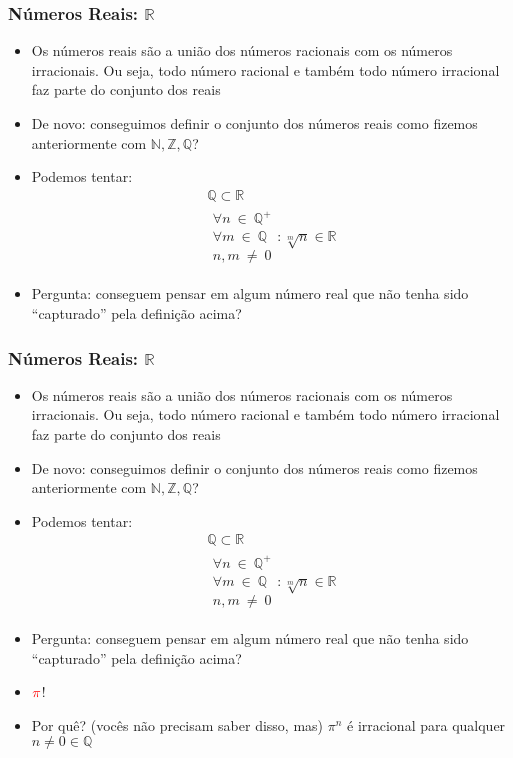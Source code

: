 \documentclass[usenames,dvipsnames,svgnames]{beamer}
\begin{document}
\begin{frame}
	
	\frametitle{Números Reais: $\mathbb{R}$}

	\begin{itemize}
		\item Os números reais são a união dos números racionais com os números irracionais. Ou seja, todo número racional e também todo número irracional faz parte do conjunto dos reais
		\item De novo: conseguimos definir o conjunto dos números reais como fizemos anteriormente com $\mathbb{N}, \mathbb{Z}, \mathbb{Q}$?
		\item Podemos tentar:
			\begin{equation}
			\begin{aligned}
				\mathbb{Q} \subset \mathbb{R} \\
				\substack{\forall n ~\in~ \mathbb{Q}^{+} \\ \forall m ~\in~ \mathbb{Q} \\ n,m ~\neq~ 0}: \sqrt[m]{n} \in \mathbb{R}
			\end{aligned}
			\end{equation}
		\item Pergunta: conseguem pensar em algum número real que não tenha sido ``capturado'' pela definição acima?
	\end{itemize}

\end{frame}

\begin{frame}
	
	\frametitle{Números Reais: $\mathbb{R}$}

	\begin{itemize}
		\item Os números reais são a união dos números racionais com os números irracionais. Ou seja, todo número racional e também todo número irracional faz parte do conjunto dos reais
		\item De novo: conseguimos definir o conjunto dos números reais como fizemos anteriormente com $\mathbb{N}, \mathbb{Z}, \mathbb{Q}$?
		\item Podemos tentar:
			\begin{equation}
			\begin{aligned}
				\mathbb{Q} \subset \mathbb{R} \\
				\substack{\forall n ~\in~ \mathbb{Q}^{+} \\ \forall m ~\in~ \mathbb{Q} \\ n,m ~\neq~ 0}: \sqrt[m]{n} \in \mathbb{R}
			\end{aligned}
			\end{equation}
		\item Pergunta: conseguem pensar em algum número real que não tenha sido ``capturado'' pela definição acima?
		\item $\color{red}\pi$!
		\item Por quê? (vocês não precisam saber disso, mas) $\pi^n$ é irracional para qualquer $n \neq 0 \in \mathbb{Q}$
	\end{itemize}

\end{frame}
\end{document}
